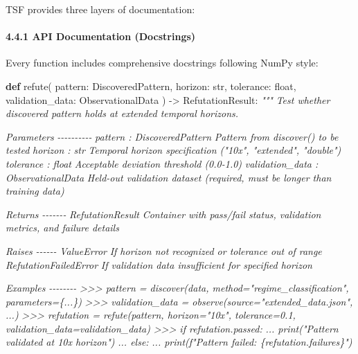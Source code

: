 \documentclass[
]{article}
\newenvironment{Shaded}{}{}
\newcommand{\BuiltInTok}[1]{\textcolor[rgb]{0.00,0.50,0.00}{#1}}
\newcommand{\CommentTok}[1]{\textcolor[rgb]{0.38,0.63,0.69}{\textit{#1}}}
\newcommand{\KeywordTok}[1]{\textcolor[rgb]{0.00,0.44,0.13}{\textbf{#1}}}
\newcommand{\NormalTok}[1]{#1}
\newcommand{\OperatorTok}[1]{\textcolor[rgb]{0.40,0.40,0.40}{#1}}
\begin{document}
TSF provides three layers of documentation:

\paragraph{4.4.1 API Documentation
(Docstrings)}\label{api-documentation-docstrings}

Every function includes comprehensive docstrings following NumPy style:

\begin{Shaded}
\begin{Highlighting}[]
\KeywordTok{def}\NormalTok{ refute(}
\NormalTok{    pattern: DiscoveredPattern,}
\NormalTok{    horizon: }\BuiltInTok{str}\NormalTok{,}
\NormalTok{    tolerance: }\BuiltInTok{float}\NormalTok{,}
\NormalTok{    validation\_data: ObservationalData}
\NormalTok{) }\OperatorTok{{-}\textgreater{}}\NormalTok{ RefutationResult:}
    \CommentTok{"""}
\CommentTok{    Test whether discovered pattern holds at extended temporal horizons.}

\CommentTok{    Parameters}
\CommentTok{    {-}{-}{-}{-}{-}{-}{-}{-}{-}{-}}
\CommentTok{    pattern : DiscoveredPattern}
\CommentTok{        Pattern from discover() to be tested}
\CommentTok{    horizon : str}
\CommentTok{        Temporal horizon specification ("10x", "extended", "double")}
\CommentTok{    tolerance : float}
\CommentTok{        Acceptable deviation threshold (0.0{-}1.0)}
\CommentTok{    validation\_data : ObservationalData}
\CommentTok{        Held{-}out validation dataset (required, must be longer than training data)}

\CommentTok{    Returns}
\CommentTok{    {-}{-}{-}{-}{-}{-}{-}}
\CommentTok{    RefutationResult}
\CommentTok{        Container with pass/fail status, validation metrics, and failure details}

\CommentTok{    Raises}
\CommentTok{    {-}{-}{-}{-}{-}{-}}
\CommentTok{    ValueError}
\CommentTok{        If horizon not recognized or tolerance out of range}
\CommentTok{    RefutationFailedError}
\CommentTok{        If validation data insufficient for specified horizon}

\CommentTok{    Examples}
\CommentTok{    {-}{-}{-}{-}{-}{-}{-}{-}}
\CommentTok{    \textgreater{}\textgreater{}\textgreater{} pattern = discover(data, method="regime\_classification", parameters=\{...\})}
\CommentTok{    \textgreater{}\textgreater{}\textgreater{} validation\_data = observe(source="extended\_data.json", ...)}
\CommentTok{    \textgreater{}\textgreater{}\textgreater{} refutation = refute(pattern, horizon="10x", tolerance=0.1, validation\_data=validation\_data)}
\CommentTok{    \textgreater{}\textgreater{}\textgreater{} if refutation.passed:}
\CommentTok{    ...     print("Pattern validated at 10x horizon")}
\CommentTok{    ... else:}
\CommentTok{    ...     print(f"Pattern failed: \{refutation.failures\}")}


\end{Highlighting}
\end{Shaded}
\end{document}

